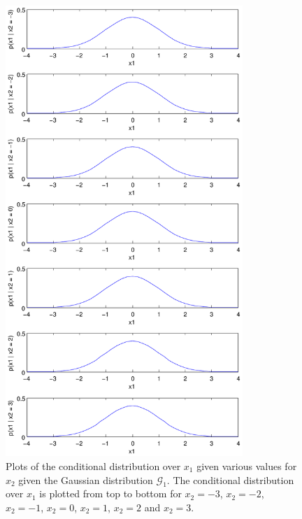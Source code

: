 \documentclass[a4paper,11pt]{article}
\begin{document}
\begin{figure}
  \begin{center}
    \caption{Plots of the conditional distribution over $x_1$ given various values for $x_2$ given the Gaussian distribution $\mathcal G_1$.  The conditional distribution over $x_1$ is plotted from top to bottom for $x_2 = -3$, $x_2 = -2$, $x_2 = -1$, $x_2 = 0$, $x_2 = 1$, $x_2 = 2$ and $x_2 = 3$.}
    \label{fig:plot2}
    \includegraphics[width=0.8\textwidth]{ex1plot2}
  \end{center}
\end{figure}
\end{document}
